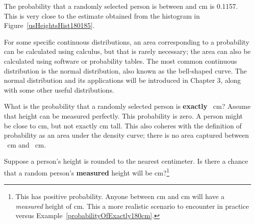 The probability that a randomly selected person is between  and  cm is 0.1157. This is very close to the estimate obtained from the histogram in Figure~\ref{usHeightsHist180185}.

For some specific continuous distributions, an area corresponding to a probability can be calculated using calculus, but that is rarely necessary; the area can also be calculated using software or probability tables. The most common continuous distribution is the normal distribution, also known as the bell-shaped curve.  The normal distribution and its applications will be introduced in Chapter 3, along with some other useful distributions.

\begin{example}{What is the probability that a randomly selected person is \textbf{exactly} ~cm? Assume that height can be measured perfectly.}
\label{probabilityOfExactly180cm}
This probability is zero. A person might be close to  cm, but not exactly  cm tall. This also coheres with the definition of probability as an area under the density curve; there is no area captured between ~cm and ~cm.
\end{example}

\begin{exercise}
Suppose a person's height is rounded to the nearest centimeter. Is there a chance that a random person's \textbf{measured} height will be  cm?\footnote{This has positive probability. Anyone between  cm and  cm will have a \emph{measured} height of  cm. This a more realistic scenario to encounter in practice versus Example~\ref{probabilityOfExactly180cm}.}
\end{exercise}


